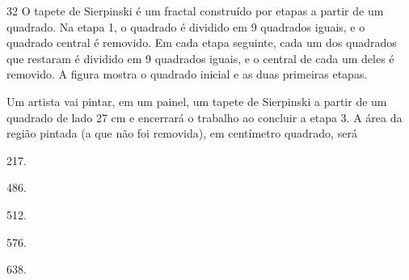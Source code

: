 \begin{questaoinedita}{3}{2}
O tapete de Sierpinski é um fractal construído por etapas a partir de um
quadrado. Na etapa 1, o quadrado é dividido em 9 quadrados iguais, e o quadrado
central é removido. Em cada etapa seguinte, cada um dos quadrados que restaram
é dividido em 9 quadrados iguais, e o central de cada um deles é removido. A
figura mostra o quadrado inicial e as duas primeiras etapas.

\begin{center}
\end{center}

Um artista vai pintar, em um painel, um tapete de Sierpinski a partir de um
quadrado de lado 27 cm e encerrará o trabalho ao concluir a etapa 3. A área da
região pintada (a que não foi removida), em centímetro quadrado, será
\begin{alternativas*}[5]
  \item 217.
  \item 486.
  \item 512.
  \item 576.
  \item 638.
\end{alternativas*}
\end{questaoinedita}
